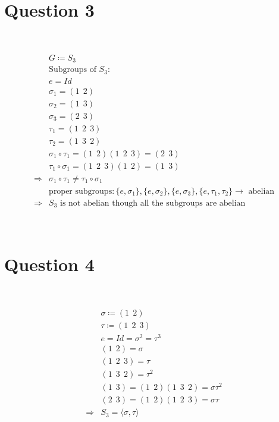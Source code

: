 \documentclass{article}
\begin{document}
\newpage

\section*{Question 3}

~

\begin{equation*}
    \begin{split}
        &G\coloneqq S_3\\
        &\text{Subgroups of }S_3:\\
        &e=Id\\
        &\sigma_1=(1\ \ 2)\\
        &\sigma_2=(1\ \ 3)\\
        &\sigma_3=(2\ \ 3)\\
        &\tau_1=(1\ \ 2\ \ 3)\\
        &\tau_2=(1\ \ 3\ \ 2)\\
        &\sigma_1\circ\tau_1=(1\ \ 2)(1\ \ 2\ \ 3)=(2\ \ 3)\\
        &\tau_1\circ\sigma_1=(1\ \ 2\ \ 3)(1\ \ 2)=(1\ \ 3)\\
        \Rightarrow&\sigma_1\circ\tau_1\ne\tau_1\circ\sigma_1\\
        &\text{proper subgroups}:\{e,\sigma_1\},\{e,\sigma_2\},\{e,\sigma_3\},\{e,\tau_1,\tau_2\}\rightarrow\text{ abelian}\\
        \Rightarrow&S_3\text{ is not abelian though all the subgroups are abelian}
    \end{split}
\end{equation*}

\newpage

~

\section*{Question 4}

~

\begin{equation*}
    \begin{split}
        &\sigma\coloneqq(1\ \ 2)\\
        &\tau\coloneqq (1\ \ 2\ \ 3)\\
        &e=Id=\sigma^2=\tau^3\\
        &(1\ \ 2)=\sigma\\
        &(1\ \ 2\ \ 3)=\tau\\
        &(1\ \ 3\ \ 2)=\tau^2\\
        &(1\ \ 3)=(1\ \ 2)(1\ \ 3\ \ 2)=\sigma\tau^2\\
        &(2\ \ 3)=(1\ \ 2)(1\ \ 2\ \ 3)=\sigma\tau\\
        \Rightarrow&S_3=\langle \sigma,\tau\rangle\\
    \end{split}
\end{equation*}
\end{document}
